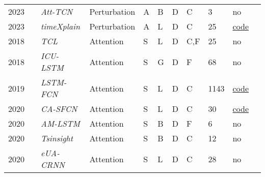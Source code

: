 \begin{table*}[p]
\begin{tabular}{@{}lllllllllll@{}}
    2023        &\cite{zhao_explainable_2023}                &\textit{Att-TCN}   & Perturbation             & A             & B             & D          & C                    & 3                 & no \\ 

    2023    & \cite{mujkanovic_timexplain_2023} & \textit{timeXplain}            & Perturbation             & A             & L             & D & C & 25 &\href{https://github.com/LoadingByte/timeXplain}{code}\\
    

    2018        & \cite{vinayavekhin_focusing_2018} &\textit{TCL}& Attention &S        & L         & D      & C,F                           & 25                & no\\  

    2018        & \cite{ge_interpretable_2018}      &\textit{\footnotesize{ICU-LSTM}}  & Attention     &S       & G        & D      & F                        & 68                & no \\  

    2019        & \cite{karim_multivariate_2019}             &\textit{\footnotesize{LSTM-FCN}} & Attention     &S       & L         & D      & C                    & 1143              & \href{https://github.com/houshd/LSTM-FCN}{code}\\ 
    
    2020        & \cite{hao_new_2020}                 &\textit{CA-SFCN}   & Attention     &S       & L         & D      & C                    & 30                & \href{https://github.com/huipingcao/nmsu_yhao_ijcai2020}{code}\\ 

    2020        & \cite{schockaert_attention_2020} & \textit{\footnotesize{AM-LSTM}}& Attention&S       & B          & D      & F                       & 6                 & no\\ 

    2020        & \cite{siddiqui_tsinsight_2020}& \textit{Tsinsight}& Attention   &S       &B           & D      & C                    & 12                & no \\ 

    2020        & \cite{tan_explainable_2021}                 &\textit{\footnotesize{eUA-CRNN}}  & Attention     &S       & L         & D      & C                                & 28                & no\\  


\end{tabular}
\end{table*}
